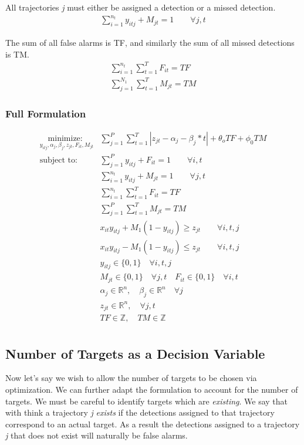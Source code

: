 \documentclass[journal]{IEEEtran}
\begin{document}
All trajectories \textit{j} must either be assigned a detection or a missed detection. 
\begin{align}
\sum_{i=1}^{n_{t}} y_{itj} + M_{jt} = 1 \qquad \forall j,t
\end{align}

The sum of all false alarms is TF, and similarly the sum of all missed detections is TM. 
\begin{align}
\sum_{i=1}^{n_{t}} \sum_{t=1}^{T} F_{it} = TF\\
\sum_{j=1}^{N_{1}} \sum_{t=1}^{T} M_{jt} = TM
\end{align}

\subsubsection{Full Formulation}

\begin{align*}
\underset{y_{itj}, \alpha_{j}, \beta_{j}, z_{jt},F_{it},M_{jt}}{\text{minimize: }} & \sum_{j=1}^{P} \sum_{t=1}^{T} |z_{jt} - \alpha_{j} - \beta_{j}*t| + \theta_{o} TF + \phi_{0} TM\\
\text{subject to: }	& \sum_{j=1}^{P} y_{itj} + F_{it} = 1 \qquad \forall i,t\\
				& \sum_{i=1}^{n_{t}} y_{itj} + M_{jt} = 1 \qquad \forall j,t\\
				& \sum_{i=1}^{n_{t}} \sum_{t=1}^{T} F_{it} = TF\\
				& \sum_{j=1}^{P} \sum_{t=1}^{T} M_{jt} = TM\\
				& x_{it}y_{itj} + M_{1}(1-y_{itj}) \geq z_{jt} \qquad \forall i,t,j\\
				& x_{it}y_{itj} - M_{1}(1-y_{itj}) \leq z_{jt} \qquad \forall i,t,j\\
			 	& y_{itj} \in \{0,1\} \quad \forall i,t,j\\
				& M_{jt} \in \{0,1\} \quad \forall j,t \quad F_{it} \in \{0,1\} \quad \forall i,t\\ 
				& \alpha_{j} \in \mathbb{R}^n,\quad \beta_{j} \in \mathbb{R}^n \quad \forall j\\
				& z_{jt} \in \mathbb{R}^n, \quad \forall j,t\\
				& TF \in \mathbb{Z}, \quad TM \in \mathbb{Z}\\
\end{align*}


\subsection{Number of Targets as a Decision Variable}
Now let's say we wish to allow the number of targets to be chosen via optimization. We can further adapt the formulation to account for the number of targets. We must be careful to identify targets which are \textit{existing}. We say that  with think a trajectory \textit{j} \textit{exists} if the detections assigned to that trajectory correspond to an actual target. As a result the detections assigned to a trajectory \textit{j} that does not exist will naturally be false alarms.
\end{document}
